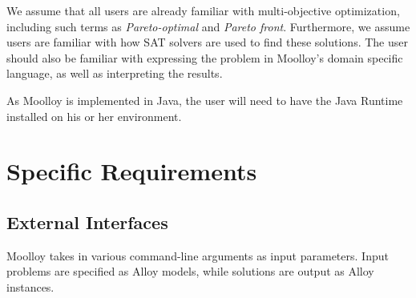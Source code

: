 \documentclass[11pt]{article}
\theoremstyle{definition}
\begin{document}

We assume that all users are already familiar with multi-objective
optimization, including such terms as \textit{Pareto-optimal} and
\textit{Pareto front}. Furthermore, we assume users are familiar with
how SAT solvers are used to find these solutions. The user should also
be familiar with expressing the problem in Moolloy's domain specific
language, as well as interpreting the results.



As Moolloy is implemented in Java, the user will need to have the Java
Runtime installed on his or her environment.

\section{Specific Requirements}\label{sec:specific_reqs}

\subsection{External Interfaces}\label{sec:ext_int}

Moolloy takes in various command-line arguments as input parameters.
Input problems are specified as Alloy models, while solutions are
output as Alloy instances.
\end{document}
